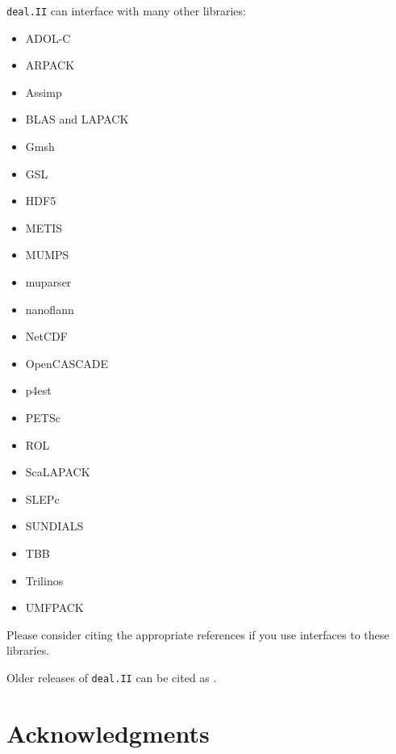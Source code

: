 \documentclass{ansarticle-preprint}
\newcommand{\specialword}[1]{\texttt{#1}}
\newcommand{\dealii}{{\specialword{deal.II}}\xspace}
\begin{document}
\dealii can interface with many other libraries:
\begin{multicols}{3}
\begin{itemize}
\item ADOL-C \cite{adol-c}
\item ARPACK \cite{arpack}
\item Assimp \cite{assimp}
\item BLAS and LAPACK
\item Gmsh \cite{geuzaine2009gmsh}
\item GSL \cite{gsl2016}
\item HDF5 \cite{hdf5}
\item METIS \cite{karypis1998fast}
\item MUMPS \cite{ADE00,MUMPS:1,MUMPS:2,mumps-web-page}
\item muparser \cite{muparser-web-page}
\item nanoflann \cite{nanoflann}
\item NetCDF \cite{rew1990netcdf}
\item OpenCASCADE \cite{opencascade-web-page}
\item p4est \cite{p4est}
\item PETSc \cite{petsc-user-ref,petsc-web-page}
\item ROL \cite{ridzal2014rapid}
\item ScaLAPACK \cite{slug}
\item SLEPc \cite{Hernandez:2005:SSF}
\item SUNDIALS \cite{sundials}
\item TBB \cite{Rei07}
\item Trilinos \cite{trilinos,trilinos-web-page}
\item UMFPACK \cite{umfpack}
\end{itemize}
\end{multicols}
Please consider citing the appropriate references if you use interfaces to these
libraries.

Older releases of \dealii can be cited as
\cite{dealII80,dealII81,dealII82,dealII83,dealII84,dealII85}.

\nocite{BangerthKanschat1999}

\section{Acknowledgments}
\end{document}
